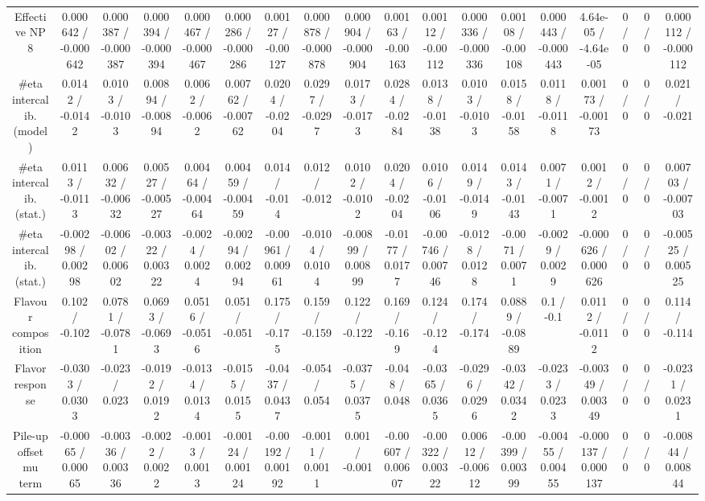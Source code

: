 \documentclass[10pt]{article}
\begin{document}
\begin{table}[htbp]
\begin{center}
\begin{tabular}{|c|c|c|c|c|c|c|c|c|c|c|c|c|c|c|c|c|c|}
  Effective NP 8 & 0.000642 / -0.000642 & 0.000387 / -0.000387 & 0.000394 / -0.000394 & 0.000467 / -0.000467 & 0.000286 / -0.000286 & 0.00127 / -0.00127 & 0.000878 / -0.000878 & 0.000904 / -0.000904 & 0.00163 / -0.00163 & 0.00112 / -0.00112 & 0.000336 / -0.000336 & 0.00108 / -0.00108 & 0.000443 / -0.000443 & 4.64e-05 / -4.64e-05 & 0 / 0 & 0 / 0 & 0.000112 / -0.000112 \\ 
  #eta intercalib. (model) & 0.0142 / -0.0142 & 0.0103 / -0.0103 & 0.00894 / -0.00894 & 0.0062 / -0.0062 & 0.00762 / -0.00762 & 0.0204 / -0.0204 & 0.0297 / -0.0297 & 0.0173 / -0.0173 & 0.0284 / -0.0284 & 0.0138 / -0.0138 & 0.0103 / -0.0103 & 0.0158 / -0.0158 & 0.0118 / -0.0118 & 0.00173 / -0.00173 & 0 / 0 & 0 / 0 & 0.021 / -0.021 \\ 
  #eta intercalib. (stat.) & 0.0113 / -0.0113 & 0.00632 / -0.00632 & 0.00527 / -0.00527 & 0.00464 / -0.00464 & 0.00459 / -0.00459 & 0.014 / -0.014 & 0.012 / -0.012 & 0.0102 / -0.0102 & 0.0204 / -0.0204 & 0.0106 / -0.0106 & 0.0149 / -0.0149 & 0.0143 / -0.0143 & 0.0071 / -0.0071 & 0.0012 / -0.0012 & 0 / 0 & 0 / 0 & 0.00703 / -0.00703 \\ 
  #eta intercalib. (stat.) & -0.00298 / 0.00298 & -0.00602 / 0.00602 & -0.00322 / 0.00322 & -0.0024 / 0.0024 & -0.00294 / 0.00294 & -0.00961 / 0.00961 & -0.0104 / 0.0104 & -0.00899 / 0.00899 & -0.0177 / 0.0177 & -0.00746 / 0.00746 & -0.0128 / 0.0128 & -0.0071 / 0.0071 & -0.0029 / 0.0029 & -0.000626 / 0.000626 & 0 / 0 & 0 / 0 & -0.00525 / 0.00525 \\ 
  Flavour composition & 0.102 / -0.102 & 0.0781 / -0.0781 & 0.0693 / -0.0693 & 0.0516 / -0.0516 & 0.051 / -0.051 & 0.175 / -0.175 & 0.159 / -0.159 & 0.122 / -0.122 & 0.169 / -0.169 & 0.124 / -0.124 & 0.174 / -0.174 & 0.0889 / -0.0889 & 0.1 / -0.1 & 0.0112 / -0.0112 & 0 / 0 & 0 / 0 & 0.114 / -0.114 \\ 
  Flavor response & -0.0303 / 0.0303 & -0.023 / 0.023 & -0.0192 / 0.0192 & -0.0134 / 0.0134 & -0.0155 / 0.0155 & -0.0437 / 0.0437 & -0.054 / 0.054 & -0.0375 / 0.0375 & -0.048 / 0.048 & -0.0365 / 0.0365 & -0.0296 / 0.0296 & -0.0342 / 0.0342 & -0.0233 / 0.0233 & -0.00349 / 0.00349 & 0 / 0 & 0 / 0 & -0.0231 / 0.0231 \\ 
  Pile-up offset mu term & -0.00065 / 0.00065 & -0.00336 / 0.00336 & -0.0022 / 0.0022 & -0.0013 / 0.0013 & -0.00124 / 0.00124 & -0.00192 / 0.00192 & -0.0011 / 0.0011 & 0.001 / -0.001 & -0.00607 / 0.00607 & -0.00322 / 0.00322 & 0.00612 / -0.00612 & -0.00399 / 0.00399 & -0.00455 / 0.00455 & -0.000137 / 0.000137 & 0 / 0 & 0 / 0 & -0.00844 / 0.00844 \\ 

\end{tabular}
\end{center}
\end{table}
\end{document}
